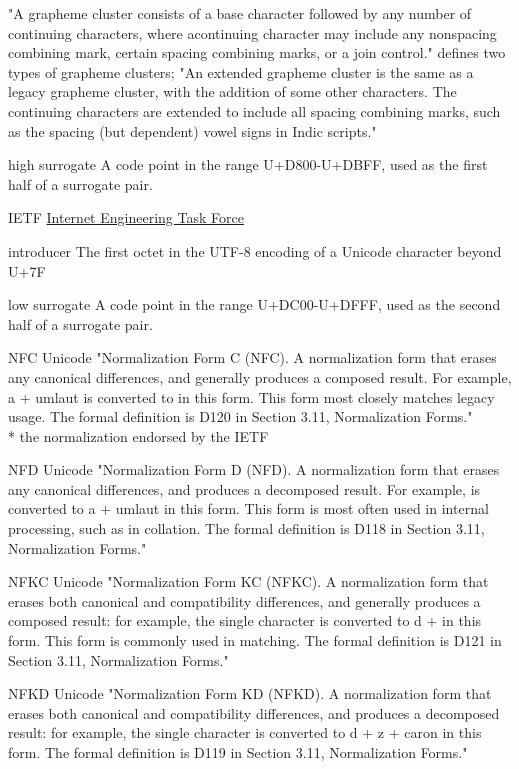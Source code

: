 \documentclass[b4paper]{article}
\begin{document}
\begin{definition}
"A grapheme cluster consists of a base character followed by any
number of continuing characters, where acontinuing character may
include any nonspacing combining mark, certain spacing combining
marks, or a join control."
{\cite{UAX29}} defines two types of grapheme clusters;
"An extended grapheme cluster is the same as a legacy grapheme cluster,
with the addition of some other characters.
The continuing characters are extended to include all spacing combining marks,
such as the spacing (but dependent) vowel signs in Indic scripts."
\item [high surrogate] A code point in the range U+D800-U+DBFF, used
as the first half of a surrogate pair.
\item [IETF] \href{https://ietf.org}{Internet Engineering Task Force}
\item [introducer] The first octet in the UTF-8 encoding of a Unicode character beyond U+7F
\item [low surrogate] A code point in the range U+DC00-U+DFFF, used
as the second half of a surrogate pair.
\item [NFC]  Unicode
"Normalization Form C (NFC). A normalization form that erases any
canonical differences, and generally produces a composed result. For
example, a + umlaut is converted to  in this form. This form most
closely matches legacy usage. The formal definition is D120 in Section
3.11, Normalization Forms."
\\*
the normalization endorsed by the IETF
\item [NFD] Unicode
"Normalization Form D (NFD). A normalization form that erases any
canonical differences, and produces a decomposed result. For example,
 is converted to a + umlaut in this form. This form is most often
used in internal processing, such as in collation. The formal
definition is D118 in Section 3.11, Normalization Forms."

\item [NFKC] Unicode
"Normalization Form KC (NFKC). A normalization form that erases both
canonical and compatibility differences, and generally produces a
composed result: for example, the single  character is converted to d
+  in this form. This form is commonly used in matching. The formal
definition is D121 in Section 3.11, Normalization Forms."

\item [NFKD] Unicode
"Normalization Form KD (NFKD). A normalization form that erases both
canonical and compatibility differences, and produces a decomposed
result: for example, the single  character is converted to d + z +
caron in this form. The formal definition is D119 in Section 3.11,
Normalization Forms."


\end{definition}
\end{document}
